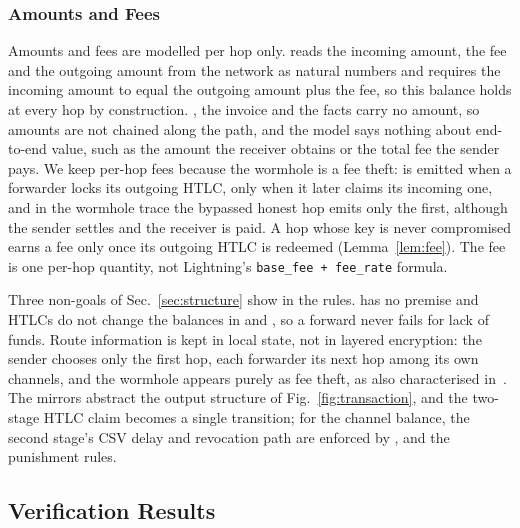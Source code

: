 \subsubsection{Amounts and Fees}\label{sec:core-amounts}
Amounts and fees are modelled per hop only.  reads the incoming amount, the
fee and the outgoing amount from the network as natural numbers and requires the incoming
amount to equal the outgoing amount plus the fee, so this balance holds at every hop by
construction. , the invoice and the  facts carry no amount,
so amounts are not chained along the path, and the model says nothing about end-to-end
value, such as the amount the receiver obtains or the total fee the sender pays. We keep per-hop
fees because the wormhole is a fee theft:  is emitted when a forwarder locks
its outgoing HTLC,  only when it later claims its incoming one, and in the
wormhole trace the bypassed honest hop emits only the first, although the
sender settles and the receiver is paid. A hop whose key is never compromised earns a
fee only once its outgoing HTLC is redeemed (Lemma~\ref{lem:fee}). The fee is one per-hop
quantity, not Lightning's \texttt{base\_fee + fee\_rate} formula.

Three non-goals of Sec.~\ref{sec:structure} show in the rules.  has no
 premise and HTLCs do not change the balances in  and ,
so a forward never fails for lack of funds. Route information is kept in local state, not in
layered encryption: the sender chooses only the first hop, each forwarder its next hop among its
own channels, and the wormhole appears purely as fee theft, as also characterised
in~\cite{malavolta2019}. The mirrors abstract the output structure of
Fig.~\ref{fig:transaction}, and the two-stage HTLC claim becomes a single transition; for the
channel balance, the second stage's CSV delay and revocation path are enforced by
,  and the punishment rules.

\subsection{Verification Results}\label{sec:verified}

